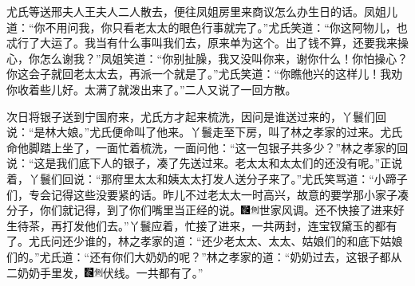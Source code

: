 尤氏等送邢夫人王夫人二人散去，便往凤姐房里来商议怎么办生日的话。凤姐儿道：“你不用问我，你只看老太太的眼色行事就完了。”尤氏笑道：“你这阿物儿，也忒行了大运了。我当有什么事叫我们去，原来单为这个。出了钱不算，还要我来操心，你怎么谢我？”凤姐笑道：“你别扯臊，我又没叫你来，谢你什么！你怕操心？你这会子就回老太太去，再派一个就是了。”尤氏笑道：“你瞧他兴的这样儿！我劝你收着些儿好。太满了就泼出来了。”二人又说了一回方散。

次日将银子送到宁国府来，尤氏方才起来梳洗，因问是谁送过来的，丫鬟们回说：“是林大娘。”尤氏便命叫了他来。丫鬟走至下房，叫了林之孝家的过来。尤氏命他脚踏上坐了，一面忙着梳洗，一面问他：“这一包银子共多少？”林之孝家的回说：“这是我们底下人的银子，凑了先送过来。老太太和太太们的还没有呢。”正说着，丫鬟们回说：“那府里太太和姨太太打发人送分子来了。”尤氏笑骂道：“小蹄子们，专会记得这些没要紧的话。昨儿不过老太太一时高兴，故意的要学那小家子凑分子，你们就记得，到了你们嘴里当正经的说。{\includegraphics[width=3mm]{../Images/00006}\includegraphics[width=3mm]{../Images/00011}\footnotesize \kaishu 世家风调。}还不快接了进来好生待茶，再打发他们去。”丫鬟应着，忙接了进来，一共两封，连宝钗黛玉的都有了。尤氏问还少谁的，林之孝家的道：“还少老太太、太太、姑娘们的和底下姑娘们的。”尤氏道：“还有你们大奶奶的呢？”林之孝家的道：“奶奶过去，这银子都从二奶奶手里发，{\includegraphics[width=3mm]{../Images/00006}\includegraphics[width=3mm]{../Images/00011}\footnotesize \kaishu 伏线。}一共都有了。”

